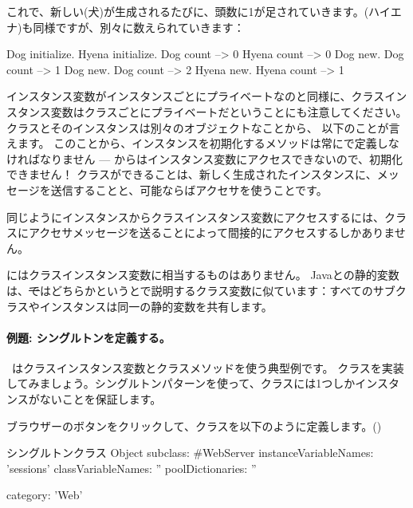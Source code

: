 \documentclass[a4paper,10pt,twoside]{book}
\begin{document}
これで、新しい(犬)が生成されるたびに、頭数に1が足されていきます。(ハイエナ)も同様ですが、別々に数えられていきます：
\begin{code}{}
Dog initialize.
Hyena initialize.
Dog count     --> 0
Hyena count --> 0
Dog new.
Dog count     --> 1
Dog new.
Dog count     --> 2
Hyena new.
Hyena count --> 1
\end{code}

インスタンス変数がインスタンスごとにプライベートなのと同様に、クラスインスタンス変数はクラスごとにプライベートだということにも注意してください。
クラスとそのインスタンスは別々のオブジェクトなことから、
以下のことが言えます。
このことから、インスタンスを初期化するメソッドは常にで定義しなければなりません --- からはインスタンス変数にアクセスできないので、初期化できません！
クラスができることは、新しく生成されたインスタンスに、メッセージを送信することと、可能ならばアクセサを使うことです。

同じようにインスタンスからクラスインスタンス変数にアクセスするには、クラスにアクセサメッセージを送ることによって間接的にアクセスするしかありません。

にはクラスインスタンス変数に相当するものはありません。
Javaとの静的変数は、\st ではどちらかというとで説明するクラス変数に似ています：すべてのサブクラスやインスタンスは同一の静的変数を共有します。

\paragraph{例題: シングルトンを定義する。}
~\cite{Alpe98a}はクラスインスタンス変数とクラスメソッドを使う典型例です。
クラスを実装してみましょう。シングルトンパターンを使って、クラスには1つしかインスタンスがないことを保証します。

ブラウザーのボタンをクリックして、クラスを以下のように定義します。()

\begin{classdef}[singleton]{シングルトンクラス}
Object subclass: #WebServer
	instanceVariableNames: 'sessions' 	
	classVariableNames: '' 	
	poolDictionaries: '' 	

	category: 'Web'
\end{classdef}
\end{document}
